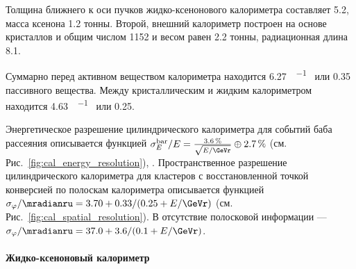 Толщина ближнего к оси пучков жидко-ксенонового калориметра составляет \SI{5.2}{\Xrad},
масса ксенона \num{1.2} тонны. 
Второй,
внешний калориметр построен на основе кристаллов  и  общим числом \num{1152} и весом равен \num{2.2} тонны, 
радиационная длина \SI{8.1}{\Xrad}.

Суммарно перед активном веществом калориметра находится 
\SI{6.27}{\gr \per \cubed \cmr} или \SI{0.35}{\Xrad} пассивного вещества.
Между кристаллическим и жидким калориметром находится 
\SI{4.63}{\gr \per \cubed \cmr} или \SI{0.25}{\Xrad}.

Энергетическое разрешение цилиндрического калориметра для событий баба рассеяния описывается функцией
$\sigma_E^{\text{bar}} / E = \frac{ \SI{3.6}{\percent} }{ \sqrt{ E / \si{\GeVr} } } \oplus \SI{2.7}{\percent}$
(см. Рис.~\ref{fig:cal_energy_resolution}), \cite{Anisenkov:2017pgv}.
Пространственное разрешение цилиндрического калориметра для кластеров с восстановленной точкой конверсией по полоскам  калориметра описывается функцией
$\sigma_{\varphi} / \si{\mradianru} = 3.70 + 0.33 / (0.25 + E / \si{\GeVr})$ (см. Рис.~\ref{fig:cal_spatial_resolution}).
В отсутствие полосковой информации
---
$\sigma_{\varphi} / \si{\mradianru} = 37.0 + 3.6 / (0.1 + E / \si{\GeVr})$.



\paragraph{Жидко-ксеноновый калориметр}
\label{sec:lxe}


